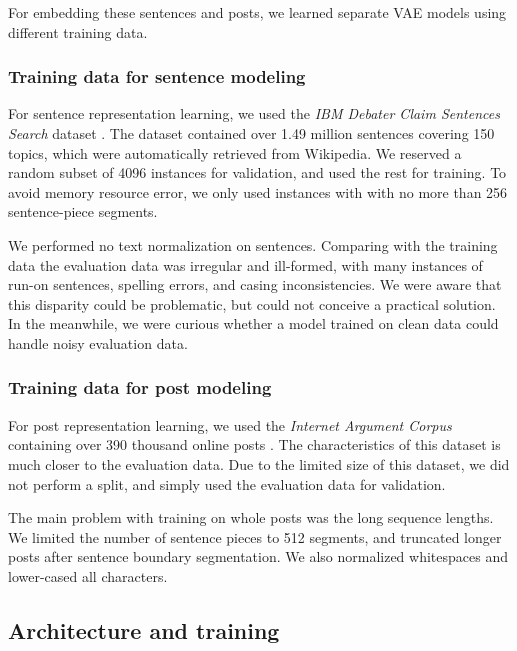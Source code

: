 \documentclass[11pt]{article}
\begin{document}
For embedding these sentences and posts,
we learned separate VAE models using different training data.

\subsubsection*{Training data for sentence modeling}

For sentence representation learning,
we used the \textit{IBM Debater Claim Sentences Search} dataset \parencite{levy2018towards}.
The dataset contained over 1.49 million sentences covering 150 topics,
which were automatically retrieved from Wikipedia.
We reserved a random subset of 4096 instances for validation,
and used the rest for training.
To avoid memory resource error,
we only used instances with with no more than 256 sentence-piece segments.

We performed no text normalization on sentences.
Comparing with the training data
the evaluation data was irregular and ill-formed,
with many instances of run-on sentences, spelling errors, and casing inconsistencies.
We were aware that this disparity could be problematic,
but could not conceive a practical solution.
In the meanwhile, we were curious whether a model trained on clean data could handle noisy evaluation data.

\subsubsection*{Training data for post modeling}

For post representation learning,
we used the \textit{Internet Argument Corpus} containing over 390 thousand online posts \parencite{walker2012corpus}.
The characteristics of this dataset is much closer to the evaluation data.
Due to the limited size of this dataset,
we did not perform a split,
and simply used the evaluation data for validation.

The main problem with training on whole posts was the long sequence lengths.
We limited the number of sentence pieces to 512 segments,
and truncated longer posts after sentence boundary segmentation.
We also normalized whitespaces and lower-cased all characters.

\subsection{Architecture and training}\label{sec:model-architecture}
\end{document}
